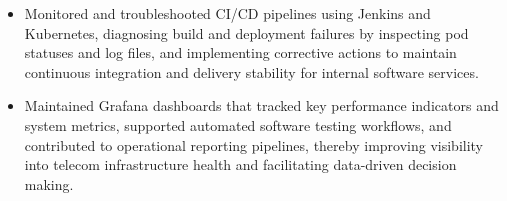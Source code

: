 \documentclass[10pt]{article}
\newcommand{\tagged}[2]{\hypertarget{#1}{#2}}
\begin{document}
\begin{minipage}[t]{0.65\textwidth}
{\begin{itemize}[leftmargin=1.2em, noitemsep, topsep=1pt, parsep=0pt]
  \item \tagged{experience_4537e570_b1}{Monitored and troubleshooted CI/CD pipelines using Jenkins and Kubernetes, diagnosing build and deployment failures by inspecting pod statuses and log files, and implementing corrective actions to maintain continuous integration and delivery stability for internal software services.}

  \item \tagged{experience_4537e570_b2}{Maintained Grafana dashboards that tracked key performance indicators and system metrics, supported automated software testing workflows, and contributed to operational reporting pipelines, thereby improving visibility into telecom infrastructure health and facilitating data-driven decision making.}

\end{itemize}
}
\vspace{5pt}


\end{minipage}
\end{document}
